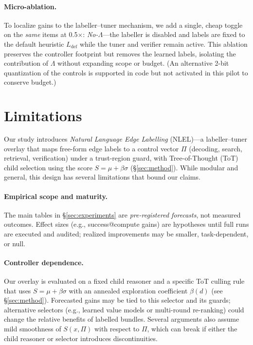 \documentclass{article}
\theoremstyle{plain}
\theoremstyle{definition}
\theoremstyle{remark}
\begin{document}
\paragraph{Micro-ablation.}
To localize gains to the labeller–tuner mechanism, we add a single, cheap toggle on the \emph{same} items at 0.5$\times$:
\emph{No-$\Lambda$}---the labeller is disabled and labels are fixed to the default heuristic $L_{\mathrm{def}}$ while the tuner and verifier remain active.
This ablation preserves the controller footprint but removes the learned labels, isolating the contribution of $\Lambda$ without expanding scope or budget.
(An alternative 2-bit quantization of the controls is supported in code but not activated in this pilot to conserve budget.)
\section{Limitations}

Our study introduces \emph{Natural Language Edge Labelling} (NLEL)---a labeller--tuner overlay that maps free-form edge labels to a control vector $\Pi$ (decoding, search, retrieval, verification) under a trust-region guard, with Tree-of-Thought (ToT) child selection using the score $S=\mu+\beta\sigma$ (\S\ref{sec:method}). While modular and general, this design has several limitations that bound our claims.

\paragraph{Empirical scope and maturity.}
The main tables in \S\ref{sec:experiments} are \emph{pre-registered forecasts}, not measured outcomes. Effect sizes (e.g., success@compute gains) are hypotheses until full runs are executed and audited; realized improvements may be smaller, task-dependent, or null.

\paragraph{Controller dependence.}
Our overlay is evaluated on a fixed child reasoner and a specific ToT culling rule that uses $S=\mu+\beta\sigma$ with an annealed exploration coefficient $\beta(d)$ (see \S\ref{sec:method}). Forecasted gains may be tied to this selector and its guards; alternative selectors (e.g., learned value models or multi-round re-ranking) could change the relative benefits of labelled bundles. Several arguments also assume mild smoothness of $S(x,\Pi)$ with respect to $\Pi$, which can break if either the child reasoner or selector introduces discontinuities.
\end{document}
